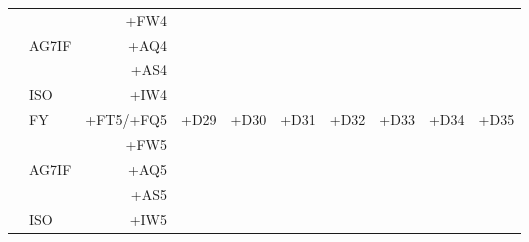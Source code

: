 \begin{center}
{\begin{tabular}{|c|lr|c|c|c|c|c|c|c|}
                        &       &      +FW4 &                            &                            &                            &                            &                            &                            &                            \\
                        & AG7IF &      +AQ4 &                            &                            &                            &                            &                            &                            &                            \\
                        &       &      +AS4 &                            &                            &                            &                            &                            &                            &                            \\
                        & ISO   &      +IW4 &                            &                            &                            &                            &                            &                            &                            \\
\hline
    \multirow{5}{0.5in}{} & FY    & +FT5/+FQ5 & \multirow[t]{5}{1in}{+D29} & \multirow[t]{5}{1in}{+D30} & \multirow[t]{5}{1in}{+D31} & \multirow[t]{5}{1in}{+D32} & \multirow[t]{5}{1in}{+D33} & \multirow[t]{5}{1in}{+D34} & \multirow[t]{5}{1in}{+D35} \\
                        &       &      +FW5 &                            &                            &                            &                            &                            &                            &                            \\
                        & AG7IF &      +AQ5 &                            &                            &                            &                            &                            &                            &                            \\
                        &       &      +AS5 &                            &                            &                            &                            &                            &                            &                            \\
                        & ISO   &      +IW5 &                            &                            &                            &                            &                            &                            &                            \\

\end{tabular}}
\end{center}
